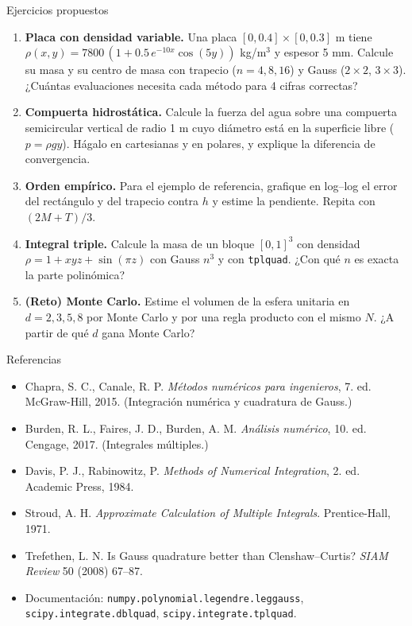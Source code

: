 \documentclass[aspectratio=169,10pt]{beamer}
\begin{document}
\begin{frame}{Ejercicios propuestos}
\small
\begin{enumerate}
\item \textbf{Placa con densidad variable.} Una placa $[0,0.4]\times[0,0.3]$ m tiene $\rho(x,y)=7800\,(1+0.5\,e^{-10x}\cos(5y))$ kg/m$^3$ y espesor 5 mm. Calcule su masa y su centro de masa con trapecio ($n=4,8,16$) y Gauss ($2\times2$, $3\times3$). ¿Cu\'antas evaluaciones necesita cada m\'etodo para 4 cifras correctas?
\item \textbf{Compuerta hidrost\'atica.} Calcule la fuerza del agua sobre una compuerta semicircular vertical de radio 1 m cuyo di\'ametro est\'a en la superficie libre ($p=\rho g y$). Hágalo en cartesianas y en polares, y explique la diferencia de convergencia.
\item \textbf{Orden emp\'irico.} Para el ejemplo de referencia, grafique en log--log el error del rect\'angulo y del trapecio contra $h$ y estime la pendiente. Repita con $(2M+T)/3$.
\item \textbf{Integral triple.} Calcule la masa de un bloque $[0,1]^3$ con densidad $\rho=1+xyz+\sin(\pi z)$ con Gauss $n^3$ y con \texttt{tplquad}. ¿Con qu\'e $n$ es exacta la parte polin\'omica?
\item \textbf{(Reto) Monte Carlo.} Estime el volumen de la esfera unitaria en $d=2,3,5,8$ por Monte Carlo y por una regla producto con el mismo $N$. ¿A partir de qu\'e $d$ gana Monte Carlo?
\end{enumerate}
\end{frame}

\begin{frame}{Referencias}
\scriptsize
\begin{itemize}
\item Chapra, S. C., Canale, R. P. \emph{M\'etodos num\'ericos para ingenieros}, 7.\textordfeminine{} ed. McGraw-Hill, 2015. (Integraci\'on num\'erica y cuadratura de Gauss.)
\item Burden, R. L., Faires, J. D., Burden, A. M. \emph{An\'alisis num\'erico}, 10.\textordfeminine{} ed. Cengage, 2017. (Integrales m\'ultiples.)
\item Davis, P. J., Rabinowitz, P. \emph{Methods of Numerical Integration}, 2.\textordfeminine{} ed. Academic Press, 1984.
\item Stroud, A. H. \emph{Approximate Calculation of Multiple Integrals}. Prentice-Hall, 1971.
\item Trefethen, L. N. Is Gauss quadrature better than Clenshaw--Curtis? \emph{SIAM Review} 50 (2008) 67--87.
\item Documentaci\'on: \texttt{numpy.polynomial.legendre.leggauss}, \texttt{scipy.integrate.dblquad}, \texttt{scipy.integrate.tplquad}.
\end{itemize}
\end{frame}
\end{document}
